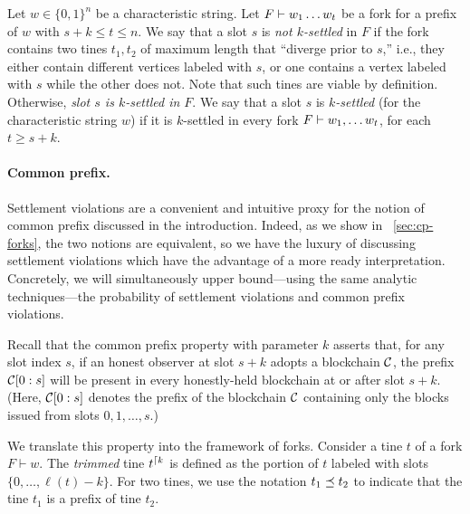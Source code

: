 \begin{definition}\label{def:settlement}
  Let $w \in \{0,1\}^n$ be a characteristic string. Let
  $F \vdash w_1 \ldots w_t$ be a fork for a prefix of $w$ with
  $s + k \leq t \leq n$.  We say that a slot $s$ is \emph{not
    $k$-settled} in $F$ if the fork contains two tines $t_1, t_2$ of
  maximum length that ``diverge prior to $s$,'' i.e., they either
  contain different vertices labeled with $s$, or one contains a
  vertex labeled with $s$ while the other does not. Note that such
  tines are viable by definition.
  Otherwise, \emph{slot $s$ is $k$-settled in $F$}. We say that a slot
  $s$ is \emph{$k$-settled} (for the characteristic string $w$) if it
  is $k$-settled in every fork $F \vdash w_1, \ldots w_t$, for each
  $t \geq s+k$.
\end{definition}

\paragraph{Common prefix.} Settlement violations are a convenient and
intuitive proxy for the notion of common prefix discussed in the
introduction. Indeed, as we show in \Section~\ref{sec:cp-forks}, the
two notions are equivalent, so we have the luxury of discussing
settlement violations which have the advantage of a more ready
interpretation. Concretely, we will simultaneously upper bound---using
the same analytic techniques---the probability of settlement
violations and common prefix violations.

Recall that the common prefix property with parameter $k$ asserts
that, for any slot index $s$, if an honest observer at slot $s + k$
adopts a blockchain $\mathcal{C}$, the prefix $\mathcal{C}[0 : s]$ will be
present in every honestly-held blockchain at or after slot $s + k$.
(Here, $\mathcal{C}[0 : s]$ denotes the prefix of the blockchain $\mathcal{C}$
containing only the blocks issued from slots $0, 1, \ldots, s$.)

We translate this property into the framework of forks.  Consider a
tine $t$ of a fork $F \vdash w$.  The \emph{trimmed} tine
$t^{\lceil {k}}$ is defined as the portion of $t$ labeled with slots
$\{ 0, \ldots, \ell(t) - k\}$. For two tines, we use the notation
$t_1 \preceq t_2$ to indicate that the tine $t_1$ is a
prefix of tine $t_2$.

